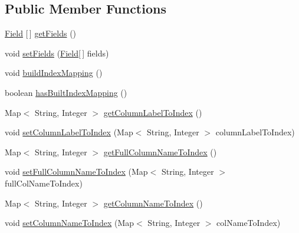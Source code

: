 \subsection*{Public Member Functions}
\begin{DoxyCompactItemize}
\item 
\mbox{\hyperlink{classcom_1_1mysql_1_1cj_1_1result_1_1_field}{Field}} \mbox{[}$\,$\mbox{]} \mbox{\hyperlink{interfacecom_1_1mysql_1_1cj_1_1protocol_1_1_column_definition_ab5231022615e60179701e8e0b763c41a}{get\+Fields}} ()
\item 
void \mbox{\hyperlink{interfacecom_1_1mysql_1_1cj_1_1protocol_1_1_column_definition_a795612d44026e85eedca7443f4f47381}{set\+Fields}} (\mbox{\hyperlink{classcom_1_1mysql_1_1cj_1_1result_1_1_field}{Field}}\mbox{[}$\,$\mbox{]} fields)
\item 
void \mbox{\hyperlink{interfacecom_1_1mysql_1_1cj_1_1protocol_1_1_column_definition_abadc6af9b7111fa0398649fe01a43308}{build\+Index\+Mapping}} ()
\item 
boolean \mbox{\hyperlink{interfacecom_1_1mysql_1_1cj_1_1protocol_1_1_column_definition_a6eafbe53ee7659c0aa45a05b8a9f77e3}{has\+Built\+Index\+Mapping}} ()
\item 
Map$<$ String, Integer $>$ \mbox{\hyperlink{interfacecom_1_1mysql_1_1cj_1_1protocol_1_1_column_definition_aa22f404b0faa1f9393ae5c34c2d943df}{get\+Column\+Label\+To\+Index}} ()
\item 
void \mbox{\hyperlink{interfacecom_1_1mysql_1_1cj_1_1protocol_1_1_column_definition_aed78b554a078a7b133507dd62a891529}{set\+Column\+Label\+To\+Index}} (Map$<$ String, Integer $>$ column\+Label\+To\+Index)
\item 
Map$<$ String, Integer $>$ \mbox{\hyperlink{interfacecom_1_1mysql_1_1cj_1_1protocol_1_1_column_definition_a68510237e7bbcb7778e1115b2c49f7ad}{get\+Full\+Column\+Name\+To\+Index}} ()
\item 
void \mbox{\hyperlink{interfacecom_1_1mysql_1_1cj_1_1protocol_1_1_column_definition_a75168874688cd04aa48f269036d2227d}{set\+Full\+Column\+Name\+To\+Index}} (Map$<$ String, Integer $>$ full\+Col\+Name\+To\+Index)
\item 
Map$<$ String, Integer $>$ \mbox{\hyperlink{interfacecom_1_1mysql_1_1cj_1_1protocol_1_1_column_definition_ad5ae6c46f96994220e21085f7aa00baa}{get\+Column\+Name\+To\+Index}} ()
\item 
void \mbox{\hyperlink{interfacecom_1_1mysql_1_1cj_1_1protocol_1_1_column_definition_a9294ea39f51afb604fa3579338bfa671}{set\+Column\+Name\+To\+Index}} (Map$<$ String, Integer $>$ col\+Name\+To\+Index)

\end{DoxyCompactItemize}
